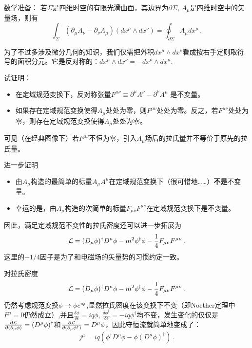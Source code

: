 \documentclass[CJK]{beamer}
\begin{document}
\begin{frame}
\bch
数学准备：
\skipline
若$\Sigma$是四维时空的有限光滑曲面，其边界为$\partial\Sigma$, $A_\mu$是四维时空中的矢量场，则有
$$\int_\Sigma (\partial_\mu A_\nu - \partial_\nu A_\mu)(dx^\mu\wedge dx^\nu) = \oint_{\partial \Sigma} A_\mu dx^\mu\, .$$

\skipline
为了不过多涉及微分几何的知识，我们仅需把外积$dx^\mu \wedge dx^\nu$看成按右手定则取符号的面积分元。它是反对称的：$dx^\mu \wedge dx^\nu = -dx^\nu \wedge dx^\mu$.
\ech
\end{frame}

\begin{frame}
\bch
试证明：
\begin{itemize}
\item{在定域规范变换下，反对称张量$F^{\mu\nu} \equiv \partial^\mu A^\nu - \partial^\nu A^\mu$ 是不变量。}
\item{如果存在定域规范变换使得$A_\mu$处处为零，则$F^{\mu\nu}$处处为零。反之，若$F^{\mu\nu}$处处为零，则存在定域规范变换使得$A_\mu$处处为零。}
\end{itemize}
可见（在经典图像下）若$F^{\mu\nu}$不恒为零，引入$A_\mu$场后的拉氏量并不等价于原先的拉氏量。
\ech
\end{frame}

\begin{frame}
\bch
进一步证明
\begin{itemize}
\item{由$A_\mu$构造的最简单的标量$A_\mu A^\mu$在定域规范变换下（很可惜地……）{\bf 不是}不变量。}
\item{幸运的是，由$A_\mu$构造的次简单的标量$F_{\mu\nu}F^{\mu\nu}$在定域规范变换下是不变量。}
\end{itemize}
因此，满足定域规范不变性的拉氏密度还可以进一步拓展为
$${\mathcal{L}} = (D_\mu\phi)^\dagger D^\mu\phi - m^2\phi^\dagger \phi - \frac{1}{4} F_{\mu\nu}F^{\mu\nu} \,.$$
这里的$-1/4$因子是为了和电磁场的矢量势的习惯约定一致。
\ech
\end{frame}

\begin{frame}
\bch
对拉氏密度
$${\mathcal{L}} = (D_\mu\phi)^\dagger D^\mu\phi - m^2\phi^\dagger \phi - \frac{1}{4} F_{\mu\nu}F^{\mu\nu} \,.$$
仍然考虑规范变换$\phi\rightarrow \phi e^{iq\epsilon}$,显然拉氏密度在该变换下不变（即Noether定理中$F^\mu=0$仍然成立）,并且$\frac{\delta\phi}{\delta\epsilon} = iq\phi$, $\frac{\delta\phi^\dagger}{\delta\epsilon} = -iq\phi^\dagger$均不变，发生变化的仅仅是$\frac{\partial{\mathcal{L}}}{\partial(\partial_\mu\phi)} = (D^\mu\phi)^\dagger$和$\frac{\partial{\mathcal{L}}}{\partial(\partial_\mu\phi^\dagger)} = D^\mu\phi$，因此守恒流就简单地变成了：
$$j^\mu = iq\left(\phi^\dagger D^\mu\phi - \phi (D^\mu \phi)^\dagger\right)\, .$$

\ech
\end{frame}
\end{document}
